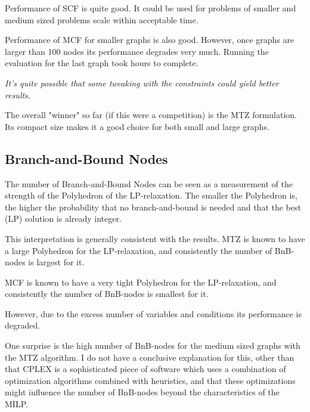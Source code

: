 \documentclass[11pt, oneside, a4paper, fleqn]{article}
\begin{document}
Performance of SCF is quite good.
It could be used for problems of smaller and medium sized problems
scale within acceptable time.

Performance of MCF for smaller graphs is also good.
However, once graphs are larger than 100 nodes its performance
degrades very much.
Running the evaluation for the last graph took hours to complete.

\emph{It's quite possible that some tweaking with the constraints
could yield better results.}

The overall "winner" so far (if this were a competition) is the
MTZ formulation. Its compact size makes it a good choice for
both small and large graphs.

\subsection*{Branch-and-Bound Nodes}

The number of Branch-and-Bound Nodes can be seen as a measurement
of the strength of the Polyhedron of the LP-relaxation.
The smaller the Polyhedron is, the higher the probability that
no branch-and-bound is needed and that the best (LP) solution
is already integer.

This interpretation is generally consistent with the results.
MTZ is known to have a large Polyhedron for the LP-relaxation,
and consistently the number of BnB-nodes is largest for it.

MCF is known to have a very tight Polyhedron for the LP-relaxation,
and consistently the number of BnB-nodes is smallest for it.

However, due to the excess number of variables and conditions
its performance is degraded.

One surprise is the high number of BnB-nodes for the medium
sized graphs with the MTZ algorithm.
I do not have a conclusive explanation for this, other than
that CPLEX is a sophisticated piece of software which
uses a combination of optimization algorithms combined
with heuristics, and that these optimizations might influence the
number of BnB-nodes beyond the characteristics of the MILP.



\end{document}
